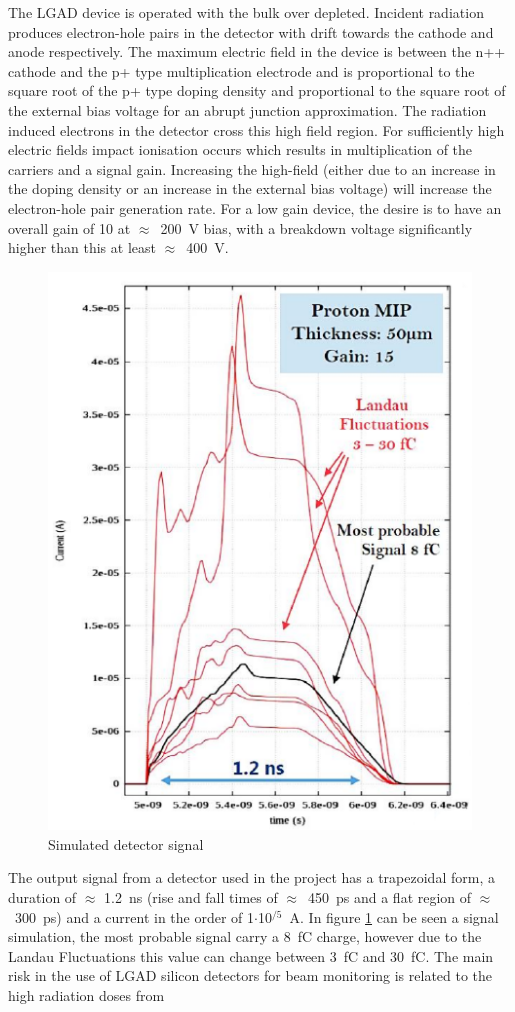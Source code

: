 \noindent The LGAD device is operated with the bulk over depleted. Incident radiation produces electron-hole
pairs in the detector with drift towards the cathode and anode respectively. The maximum
electric field in the device is between the n++ cathode and the p+ type multiplication electrode and is
proportional to the square root of the p+ type doping density and proportional to the square root of the
external bias voltage for an abrupt junction approximation.
The radiation induced electrons in the detector cross this high field region. For sufficiently
high electric fields impact ionisation occurs which results in multiplication of the carriers and a
signal gain.
Increasing the high-field (either due to an increase in the doping density or
an increase in the external bias voltage) will increase the electron-hole pair generation rate. For a
low gain device, the desire is to have an overall gain of 10 at $\approx$~200~V bias, with a breakdown voltage
significantly higher than this at least $\approx$~400~V.
\begin{figure}[H]
	\centering
	\includegraphics[width=0.35\linewidth]{IMG/ch2/LGAD_Signal}
	\caption{Simulated detector signal}
	\label{fig:signal}
\end{figure}
\noindent The output signal from a detector used in the project has a trapezoidal form, a duration of $\approx$ 1.2~ns (rise and fall times of $\approx$~450~ps and a 
flat region of $\approx$~300~ps) and a current in the order of 1$\cdot$10$^{/5}$~A.
In figure \ref{fig:signal} can be seen a signal simulation, the most probable signal carry a 8~fC charge, however due to the Landau Fluctuations this value can change between 3~fC and 30~fC.
\noindent The main risk in
the use of LGAD silicon detectors for beam monitoring is related to the high radiation doses from
